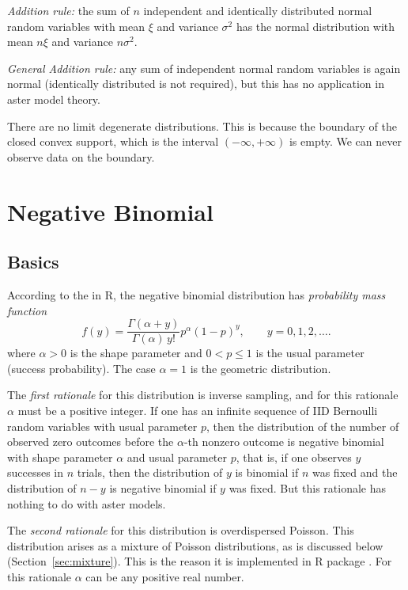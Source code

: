\emph{Addition rule:} the sum of $n$ independent and identically distributed
normal random variables with mean $\xi$ and variance $\sigma^2$ has the normal
distribution with mean $n \xi$ and variance $n \sigma^2$.

\emph{General Addition rule:} any sum of independent
normal random variables is again normal
(identically distributed is not required), but this has no application
in aster model theory.

There are no limit degenerate distributions.
This is because the boundary of the closed convex support,
which is the interval $(- \infty, + \infty)$ is empty.
We can never observe data on the boundary.

\section{Negative Binomial}
\label{sec:negative-binomial}

\subsection{Basics}
\label{sec:negative-binomial-basics}

According to the  in R, the negative binomial
distribution has \emph{probability mass function}
\begin{equation} \label{eq:negative-binomial-pmf}
   f(y) = \frac{\Gamma(\alpha + y)}{\Gamma(\alpha) \, y!} p^\alpha (1-p)^y,
   \qquad y = 0, 1, 2, \ldots.
\end{equation}
where $\alpha > 0$ is the shape parameter and $0 < p \le 1$ is the
usual parameter (success probability).  The case $\alpha = 1$ is the
geometric distribution.

The \emph{first rationale} for this distribution is inverse sampling,
and for this rationale $\alpha$ must be a positive integer.
If one has an infinite
sequence of IID Bernoulli random variables with usual parameter $p$,
then the distribution of the number of observed zero outcomes before the
$\alpha$-th nonzero outcome is negative binomial with shape parameter $\alpha$
and usual parameter $p$, that is, if one observes $y$ successes in $n$ trials,
then the distribution of $y$ is binomial if $n$ was fixed and the distribution
of $n - y$ is negative binomial if $y$ was fixed.
But this rationale has nothing to do with aster models.

The \emph{second rationale} for this distribution is overdispersed Poisson.
This distribution arises as a mixture of Poisson distributions,
as is discussed below (Section~\ref{sec:mixture}).
This is the reason it is implemented in R package
.  For this rationale $\alpha$ can be any positive real number.

